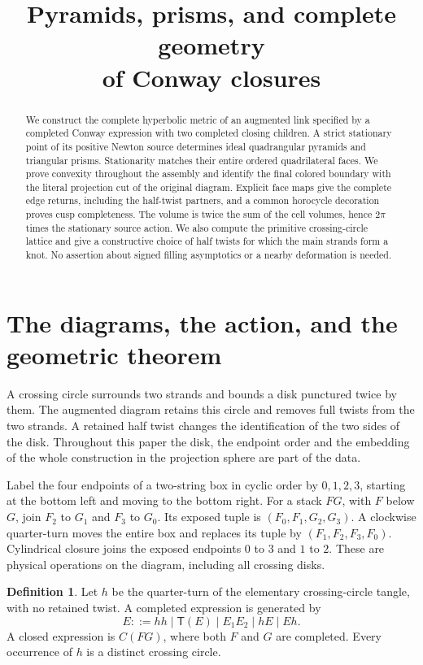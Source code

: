 \documentclass[11pt]{article}
\title{Pyramids, prisms, and complete geometry\\of Conway closures}
\author{}\date{}
\numberwithin{equation}{section}
\theoremstyle{definition}\newtheorem{definition}[theorem]{Definition}
\theoremstyle{remark}\newtheorem{remark}[theorem]{Remark}
\newcommand{\Turn}{\mathsf T}
\begin{document}
\maketitle
\begin{abstract}
We construct the complete hyperbolic metric of an augmented link
specified by a completed Conway expression with two completed closing
children. A strict stationary point of its positive Newton source
determines ideal quadrangular pyramids and triangular prisms.
Stationarity matches their entire ordered quadrilateral faces.
We prove convexity throughout the assembly and identify the final
colored boundary with the literal projection cut of the original
diagram. Explicit face maps give the complete edge returns, including
the half-twist partners, and a common horocycle decoration proves cusp
completeness. The volume is twice the sum of the cell volumes, hence
$2\pi$ times the stationary source action. We also compute the primitive
crossing-circle lattice and give a constructive choice of half twists
for which the main strands form a knot. No assertion about signed
filling asymptotics or a nearby deformation is needed.
\end{abstract}

\section{The diagrams, the action, and the geometric theorem}
\label{cg:intro}

A crossing circle surrounds two strands and bounds a disk punctured
twice by them. The augmented diagram retains this circle and removes
full twists from the two strands. A retained half twist changes the
identification of the two sides of the disk. Throughout this paper the
disk, the endpoint order and the embedding of the whole construction
in the projection sphere are part of the data.

Label the four endpoints of a two-string box in cyclic order by
$0,1,2,3$, starting at the bottom left and moving to the bottom right.
For a stack $FG$, with $F$ below $G$, join $F_2$ to $G_1$ and $F_3$
to $G_0$. Its exposed tuple is $(F_0,F_1,G_2,G_3)$.
A clockwise quarter-turn moves the entire box and replaces its tuple
by $(F_1,F_2,F_3,F_0)$. Cylindrical closure joins the exposed endpoints
$0$ to $3$ and $1$ to $2$. These are physical operations on the
diagram, including all crossing disks.

\begin{definition}\label{cg:grammar}
Let $h$ be the quarter-turn of the elementary crossing-circle tangle,
with no retained twist. A completed expression is generated by
\[
 E::=hh\mid\Turn(E)\mid E_1E_2\mid hE\mid Eh.
\]
A closed expression is $C(FG)$, where both $F$ and $G$ are completed.
Every occurrence of $h$ is a distinct crossing circle.
\end{definition}
\end{document}
